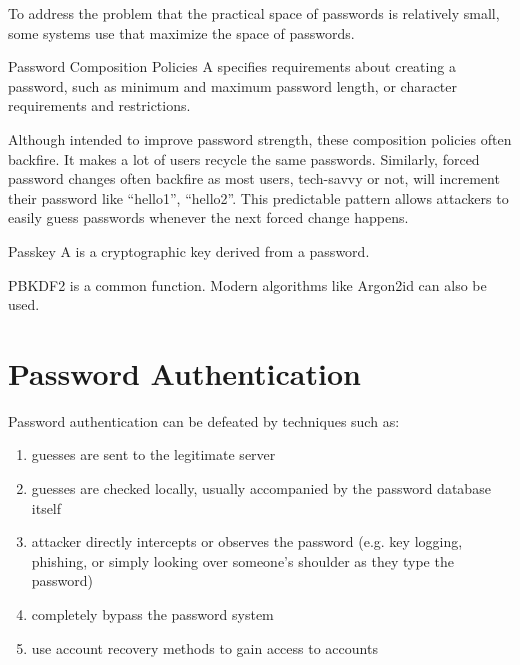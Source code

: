 To address the problem that the practical space of passwords is relatively small, some systems use  that maximize the space of passwords.

\begin{dfnbox}{Password Composition Policies}{}
    A  specifies requirements about creating a password, such as minimum and maximum password length, or character requirements and restrictions.
\end{dfnbox}

Although intended to improve password strength, these composition policies often backfire. It makes a lot of users recycle the same passwords. Similarly, forced password changes often backfire as most users, tech-savvy or not, will increment their password like ``hello1'', ``hello2''. This predictable pattern allows attackers to easily guess passwords whenever the next forced change happens.

\begin{dfnbox}{Passkey}{}
    A  is a cryptographic key derived from a password.
\end{dfnbox}

PBKDF2 is a common function. Modern algorithms like Argon2id can also be used.

\section{Password Authentication}

Password authentication can be defeated by techniques such as:
\begin{enumerate}[noitemsep]
    \item {} guesses are sent to the legitimate server
    \item {} guesses are checked locally, usually accompanied by the password database itself
    \item {} attacker directly intercepts or observes the password (e.g. key logging, phishing, or simply looking over someone's shoulder as they type the password)
    \item {} completely bypass the password system
    \item {} use account recovery methods to gain access to accounts
\end{enumerate}

